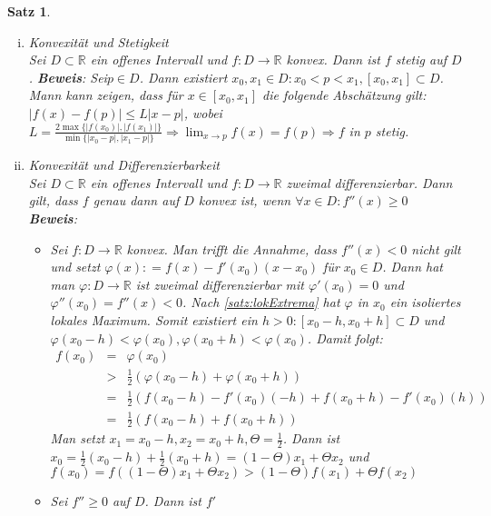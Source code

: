 \documentclass[ngerman,titlepage,twoside, parskip=half*]{scrreprt}
\newcommand*{\R}{\mathbb{R}}
\theoremstyle{plain}
\newtheorem{theorem}{Satz}[section]
\theoremstyle{definition}
\theoremstyle{remark}
\newcommand*{\abs}[2][]{#1\lvert#2#1\rvert}
\newcommand*{\coloneqq}{\mathrel{\mathop:}=}
\begin{document}
\begin{theorem}
  \begin{enumerate}[(i)]
    \item \textit{Konvexität und Stetigkeit}\\
      Sei $D\subset\R$ ein offenes Intervall und $f\colon D\rightarrow\R$
      konvex. Dann ist $f$ stetig auf $D$.
      \textbf{Beweis}: Sei$p\in D$. Dann existiert $x_0,x_1\in D\colon
      x_0<p<x_1, [x_0,x_1]\subset D$. Mann kann zeigen, dass für
      $x\in[x_0,x_1]$ die folgende Abschätzung gilt:\\
      $\abs{f(x)-f(p)}\leq L\abs{x-p}$, wobei $L=
      \frac{2\max\{\abs{f(x_0)},\abs{f(x_1)}\}}{\min\{\abs{x_0-p},\abs{x_1-p}\}}
      \Rightarrow\lim_{x\rightarrow p} f(x)=f(p)\Rightarrow f$ in $p$
      stetig.
    \item \textit{Konvexität und Differenzierbarkeit}\\
      Sei $D\subset\R$ ein offenes Intervall und $f\colon D\rightarrow\R$
      zweimal differenzierbar. Dann gilt, dass $f$ genau dann auf $D$
      konvex ist, wenn $\forall x\in D\colon f''(x)\geq 0$\\
      \textbf{Beweis}: \begin{itemize}
	\item["`$\Rightarrow$"'] Sei $f\colon D\rightarrow\R$ konvex. Man
	  trifft die Annahme, dass $f''(x)<0$ \emph{nicht} gilt und
	  setzt $\varphi(x)\coloneqq f(x)-f'(x_0)(x-x_0)$ für $x_0\in D$. Dann
	  hat man $\varphi\colon D\rightarrow\R$ ist zweimal differenzierbar
	  mit $\varphi'(x_0)=0$ und $\varphi''(x_0)=f''(x)<0$. Nach
	  \autoref{satz:lokExtrema} hat $\varphi$ in $x_0$ ein
	  isoliertes lokales Maximum. Somit existiert ein $h>0\colon
	  [x_0-h,x_0+h]\subset D$ und $\varphi(x_0-h)<\varphi(x_0),
	  \varphi(x_0+h)<\varphi(x_0)$. Damit folgt:
	  \begin{align*}
	    f(x_0)&=& \varphi(x_0)\\
	    &>& \frac{1}{2}(\varphi(x_0-h)+\varphi(x_0+h))\\
	    &=& \frac{1}{2}(f(x_0-h)-f'(x_0)(-h)+f(x_0+h)-f'(x_0)(h))\\
	    &=& \frac{1}{2}(f(x_0-h)+f(x_0+h))
	  \end{align*}
	  Man setzt $x_1=x_0-h, x_2=x_0+h, \Theta=\frac{1}{2}$. Dann ist
	  $x_0=\frac{1}{2}(x_0-h)+\frac{1}{2}(x_0+h)=(1-\Theta)x_1+
	  \Theta x_2$ und $f(x_0)=f( (1-\Theta)x_1+\Theta x_2)>(1-\Theta)
	  f(x_1)+\Theta f(x_2)$\textnormal{\lightning}
	\item["`$\Leftarrow$"'] Sei $f''\geq 0$ auf $D$. Dann ist $f'$

\end{itemize}
\end{enumerate}
\end{theorem}
\end{document}
